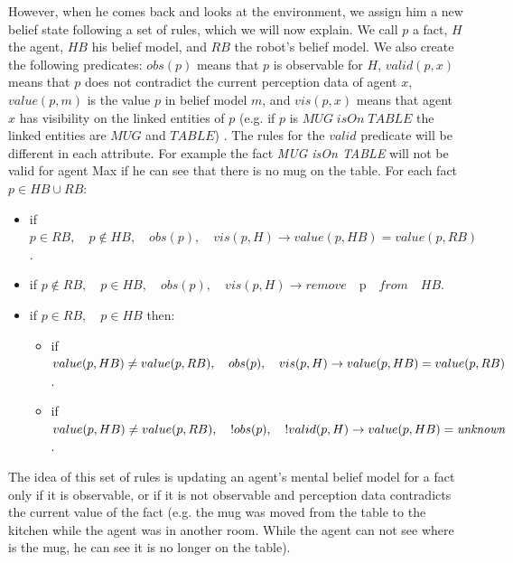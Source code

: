 However, when he comes back and looks at the environment, we assign him a new belief state following a set of rules, which we will now explain. We call $p$ a fact, $H$ the agent, $HB$ his belief model, and $RB$ the robot's belief model. We also create the following predicates: $obs(p)$ means that $p$ is observable for $H$, $valid(p,x)$ means that $p$ does not contradict the current perception data of agent $x$, $value(p,m)$ is the value $p$ in belief model $m$, and $vis(p,x)$ means that agent $x$ has visibility on the linked entities of $p$ (e.g. if $p$ is $MUG\; isOn \; TABLE$ the linked entities are $MUG$ and $TABLE$) . The rules for the $valid$ predicate will be different in each attribute. For example the fact \textit{MUG isOn TABLE} will not be valid for agent Max if he can see that there is no mug on the table. For each fact $p\in HB \cup RB$:
\begin{itemize}
\item if $p \in RB, \quad p\not\in HB,\quad obs(p),\quad vis(p,H) \rightarrow value(p,HB)=value(p,RB)$.
\item if $p \not \in RB,\quad p\in HB,\quad obs(p),\quad vis(p,H) \rightarrow remove\quad $p$ \quad from \quad HB$.
\item if $p\in RB,\quad p\in HB$ then:
	\begin{itemize}
      \item if $value(p,HB)\neq value(p,RB),\\ \quad obs(p),\quad vis(p,H) \rightarrow \\ value(p,HB)=value(p,RB)$.
      \item if $value(p,HB)\neq value(p,RB),\\ \quad !obs(p),\quad !valid(p,H) \rightarrow \\ value(p,HB)=\textit{unknown}$.
	\end{itemize}
\end{itemize}
The idea of this set of rules is updating an agent's mental belief model for a fact only if it is observable, or if it is not observable and perception data contradicts the current value of the fact (e.g. the mug was moved from the table to the kitchen while the agent was in another room. While the agent can not see where is the mug, he can see it is no longer on the table).



